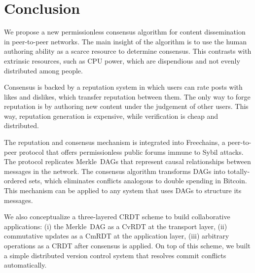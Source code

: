 \documentclass[10pt,journal,compsoc]{IEEEtran}
\newcommand{\FC}       {Freechains\xspace}
\begin{document}
\section{Conclusion}
\label{sec.conclusion}

We propose a new permissionless consensus algorithm for content dissemination
in peer-to-peer networks.
The main insight of the algorithm is to use the human authoring ability as a
scarce resource to determine consensus.
This contrasts with extrinsic resources, such as CPU power, which are
dispendious and not evenly distributed among people.%

Consensus is backed by a reputation system in which users can rate posts with
likes and dislikes, which transfer reputation between them.
The only way to forge reputation is by authoring new content under the
judgement of other users.
This way, reputation generation is expensive, while verification is cheap and
distributed.

The reputation and consensus mechanism is integrated into \FC, a peer-to-peer
protocol that offers permissionless public forums immune to Sybil attacks.
The protocol replicates Merkle~DAGs that represent causal relationships between
messages in the network.
The consensus algorithm transforms DAGs into totally-ordered sets, which
eliminates conflicts analogous to double spending in Bitcoin.
This mechanism can be applied to any system that uses DAGs to structure its
messages.

We also conceptualize a three-layered CRDT scheme to build collaborative
applications:
    (i)   the Merkle~DAG as a CvRDT at the transport layer,
    (ii)  commutative updates as a CmRDT at the application layer,
    (iii) arbitrary operations as a CRDT after consensus is applied.
%
On top of this scheme, we built a simple distributed version control system
that resolves commit conflicts automatically.
\end{document}
